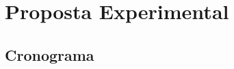 \chapter{Proposta Experimental}
\label{chap:proposta}
\lipsum[2-4]

\section{Cronograma}
\label{sec:cronograma}

\lipsum[2-4]



